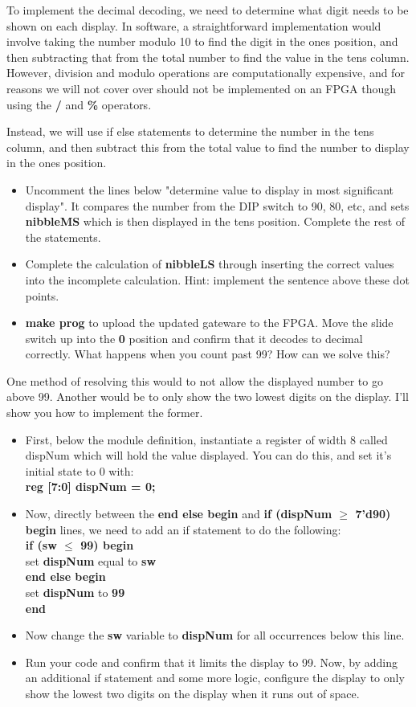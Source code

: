 \documentclass[12pt,a4paper]{article}
\begin{document}
	To implement the decimal decoding, we need to determine what digit needs to be shown on each display. In software, a straightforward implementation would involve taking the number modulo 10 to find the digit in the ones position, and then subtracting that from the total number to find the value in the tens column.  However, division and modulo operations are computationally expensive, and for reasons we will not cover over should not be implemented on an FPGA though using the \textbf{/} and \textbf{\%} operators.
	
	Instead, we will use if else statements to determine the number in the tens column, and then subtract this from the total value to find the number to display in the ones position.  
	
	\begin{itemize}
		\item Uncomment the lines below "determine value to display in most significant display". It compares the number from the DIP switch to 90, 80, etc, and sets \textbf{nibbleMS} which is then displayed in the tens position. Complete the rest of the statements. 
		\item Complete the calculation of \textbf{nibbleLS} through inserting the correct values into the incomplete calculation. Hint: implement the sentence above these dot points.
		\item \textbf{make prog} to upload the updated gateware to the FPGA. Move the slide switch up into the \textbf{0} position and confirm that it decodes to decimal correctly. What happens when you count past 99? How can we solve this?
	\end{itemize}
	One method of resolving this would to not allow the displayed number to go above 99. Another would be to only show the two lowest digits on the display. I'll show you how to implement the former.
	\begin{itemize}
		\item First, below the module definition, instantiate a register of width 8 called dispNum which will hold the value displayed. You can do this, and set it's initial state to 0 with: \\ \textbf{reg [7:0] dispNum = 0;}
		\item Now, directly between the \textbf{end else begin} and \textbf{if (dispNum $\ge$ 7'd90) begin} lines, we need to add an if statement to do the following: \\ 
		\textbf{if (sw $\le$ 99) begin}\\
		set \textbf{dispNum} equal to \textbf{sw}\\
		\textbf{end else begin}\\
		set \textbf{dispNum} to \textbf{99}\\
		\textbf{end}
		\item Now change the \textbf{sw} variable to \textbf{dispNum} for all occurrences below this line.
		\item Run your code and confirm that it limits the display to 99. Now, by adding an additional if statement and some more logic, configure the display to only show the lowest two digits on the display when it runs out of space.
	\end{itemize}
\end{document}

